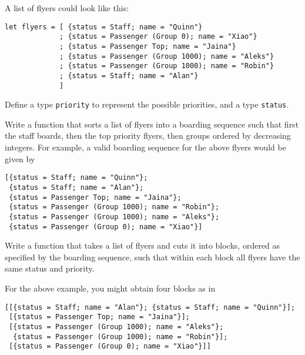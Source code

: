 \documentclass[arhiv]{../izpit}
\begin{document}
A list of flyers could look like this:
\begin{verbatim}
let flyers = [ {status = Staff; name = "Quinn"}
             ; {status = Passenger (Group 0); name = "Xiao"}
             ; {status = Passenger Top; name = "Jaina"}
             ; {status = Passenger (Group 1000); name = "Aleks"}
             ; {status = Passenger (Group 1000); name = "Robin"}
             ; {status = Staff; name = "Alan"}
             ]
\end{verbatim}

Define a type \verb|priority| to represent the possible priorities, and a type \verb|status|.

\naloga

Write a function that sorts a list of flyers into a boarding sequence such that first the staff boards, then the top priority flyers, then groups ordered by decreasing integers. For example, a valid boarding sequence for the above flyers would be given by

\begin{verbatim}
[{status = Staff; name = "Quinn"};
 {status = Staff; name = "Alan"};
 {status = Passenger Top; name = "Jaina"};
 {status = Passenger (Group 1000); name = "Robin"};
 {status = Passenger (Group 1000); name = "Aleks"};
 {status = Passenger (Group 0); name = "Xiao"}]
\end{verbatim}

\naloga

Write a function that takes a list of flyers and cuts it into blocks, ordered as specified by the boarding sequence, such that within each block all flyers have the same status and priority.

For the above example, you might obtain four blocks as in
\begin{verbatim}
[[{status = Staff; name = "Alan"}; {status = Staff; name = "Quinn"}];
 [{status = Passenger Top; name = "Jaina"}];
 [{status = Passenger (Group 1000); name = "Aleks"};
  {status = Passenger (Group 1000); name = "Robin"}];
 [{status = Passenger (Group 0); name = "Xiao"}]]
\end{verbatim}
\end{document}
